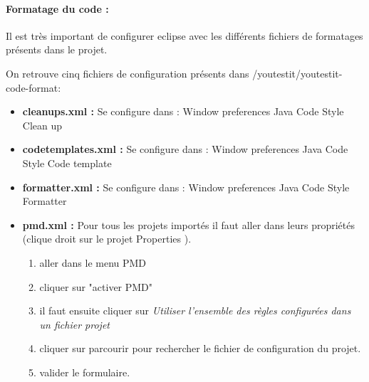 \paragraph{Formatage du code :}
Il est très important de configurer eclipse avec les différents fichiers de formatages
présents dans le projet. 

On retrouve cinq fichiers de configuration présents dans /youtestit/youtestit-code-format:
\begin{itemize}
	\item  \textbf{cleanups.xml :}  Se configure dans : Window \rightArrow{}
				  preferences \rightArrow{} Java \rightArrow{} Code Style \rightArrow{} Clean up

	\item \textbf{codetemplates.xml :}  Se configure dans : Window \rightArrow{}
				 preferences \rightArrow{} Java \rightArrow{} Code Style \rightArrow{} Code template

	\item \textbf{formatter.xml :} Se configure dans : Window \rightArrow{}
				 preferences \rightArrow{} Java \rightArrow{} Code Style \rightArrow{} Formatter

	\item  \textbf{pmd.xml :} Pour tous les projets importés il faut aller dans leurs propriétés  
		(clique droit sur le projet \rightArrow{} Properties ).
		\begin{enumerate}
			\item aller dans le menu PMD
			\item cliquer sur "activer PMD"
			\item il faut ensuite cliquer sur \emph{Utiliser l'ensemble des règles configurées dans un fichier projet}
			\item cliquer sur parcourir pour rechercher le fichier de configuration du projet.
			\item valider le formulaire.
		\end{enumerate}



\end{itemize}
